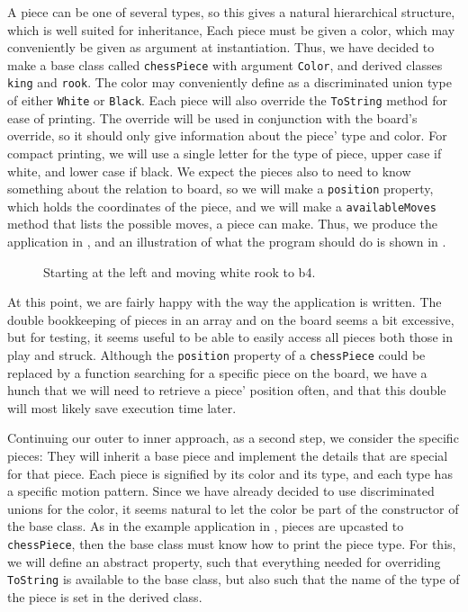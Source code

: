 A piece can be one of several types, so this gives a natural hierarchical structure, which is well suited for inheritance, Each piece must be given a color, which may conveniently be given as argument at instantiation. Thus, we have decided to make a base class called \lstinline{chessPiece} with argument \lstinline{Color}, and derived classes \lstinline{king} and \lstinline{rook}. The color may conveniently define as a discriminated union type of either \lstinline{White} or \lstinline{Black}. Each piece will also override the \lstinline{ToString} method for ease of printing. The override will be used in conjunction with the board's override, so it should only give information about the piece' type and color. For compact printing, we will use a single letter for the type of piece, upper case if white, and lower case if black. We expect the pieces also to need to know something about the relation to board, so we will make a \lstinline{position} property, which holds the coordinates of the piece, and we will make a \lstinline{availableMoves} method that lists the possible moves, a piece can make. Thus, we produce the application in , and an illustration of what the program should do is shown in .
%
%
\begin{figure}
  \centering
  \newgame
  \showboard
  \hspace*{1cm}
  \showboard
  \caption{Starting at the left and moving white rook to b4.}
  \label{fig:chessKingsGame}
\end{figure}
At this point, we are fairly happy with the way the application is written. The double bookkeeping of pieces in an array and on the board seems a bit excessive, but for testing, it seems useful to be able to easily access all pieces both those in play and struck. Although the \lstinline{position} property of a \lstinline{chessPiece} could be replaced by a function searching for a specific piece on the board, we have a hunch that we will need to retrieve a piece' position often, and that this double will most likely save execution time later. 

Continuing our outer to inner approach, as a second step, we consider the specific pieces: They will inherit a base piece and implement the details that are special for that piece. Each piece is signified by its color and its type, and each type has a specific motion pattern. Since we have already decided to use discriminated unions for the color, it seems natural to let the color be part of the constructor of the base class. As in the example application in , pieces are upcasted to \lstinline{chessPiece}, then the base class must know how to print the piece type. For this, we will define an abstract property, such that everything needed for overriding \lstinline{ToString} is available to the base class, but also such that the name of the type of the piece is set in the derived class.

